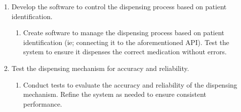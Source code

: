 \documentclass{article}
\begin{document}
\begin{enumerate}
\begin{enumerate}
    \item Develop the software to control the dispensing process based on patient identification.
    \begin{enumerate}
        \item Create software to manage the dispensing process based on patient identification (ie; connecting it to the aforementioned API). Test the system to ensure it dispenses the correct medication without errors.
    \end{enumerate}

    \item Test the dispensing mechanism for accuracy and reliability.
    \begin{enumerate}
        \item Conduct tests to evaluate the accuracy and reliability of the dispensing mechanism. Refine the system as needed to ensure consistent performance.
    \end{enumerate}
    
\end{enumerate}
\end{enumerate}
\end{document}
